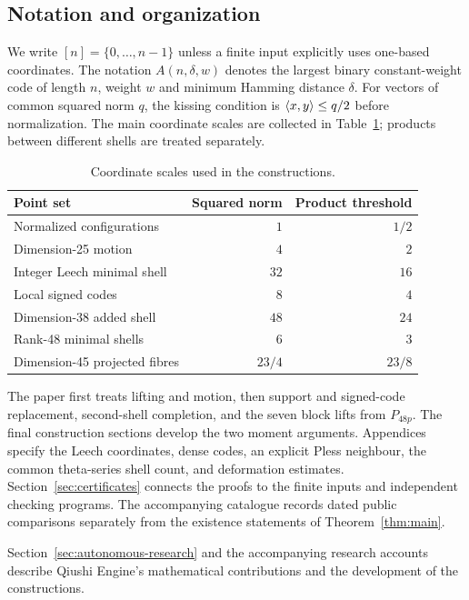 \subsection{Notation and organization}

We write $[n]=\{0,\ldots,n-1\}$ unless a finite input explicitly uses
one-based coordinates. The notation $A(n,\delta,w)$ denotes the largest
binary constant-weight code of length $n$, weight $w$ and minimum
Hamming distance $\delta$. For vectors of common squared norm $q$,
the kissing condition is $\langle x,y\rangle\le q/2$ before normalization.
The main coordinate scales are collected in Table~\ref{tab:scales};
products between different shells are treated separately.

\begin{table}[ht]
\centering
\caption{Coordinate scales used in the constructions.}
\label{tab:scales}
\begin{tabular}{lrr}\toprule
Point set & Squared norm & Product threshold\\\midrule
Normalized configurations & $1$ & $1/2$\\
Dimension-25 motion & $4$ & $2$\\
Integer Leech minimal shell & $32$ & $16$\\
Local signed codes & $8$ & $4$\\
Dimension-38 added shell & $48$ & $24$\\
Rank-48 minimal shells & $6$ & $3$\\
Dimension-45 projected fibres & $23/4$ & $23/8$\\\bottomrule
\end{tabular}
\end{table}

The paper first treats lifting and motion, then support and signed-code
replacement, second-shell completion, and the seven block lifts from $P_{48p}$.
The final construction sections develop the two moment arguments.
Appendices specify the Leech coordinates, dense codes, an explicit Pless
neighbour, the common theta-series shell count, and deformation estimates.
Section~\ref{sec:certificates} connects
the proofs to the finite inputs and independent checking programs.
The accompanying catalogue records dated public comparisons separately
from the existence statements of Theorem~\ref{thm:main}.

Section~\ref{sec:autonomous-research} and the accompanying research
accounts describe Qiushi Engine's mathematical contributions and the
development of the constructions.
